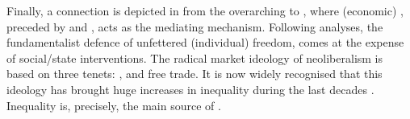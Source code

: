 Finally, a connection is depicted in  from the overarching  to , where (economic) , preceded by  and , acts as the mediating mechanism. Following \textcite{monbiot2016_Neoliberalismideology,klein2008_shockdoctrinerise} analyses, the fundamentalist defence of unfettered (individual) freedom, comes at the expense of social/state interventions. The radical market ideology of neoliberalism is based on three tenets: ,  and free trade. It is now widely recognised that this ideology has brought huge increases in inequality during the last decades \parencite{milanovic2016_GlobalInequality,piketty2014_CapitalTwentyFirst}. Inequality is, precisely, the main source of .

%
%
